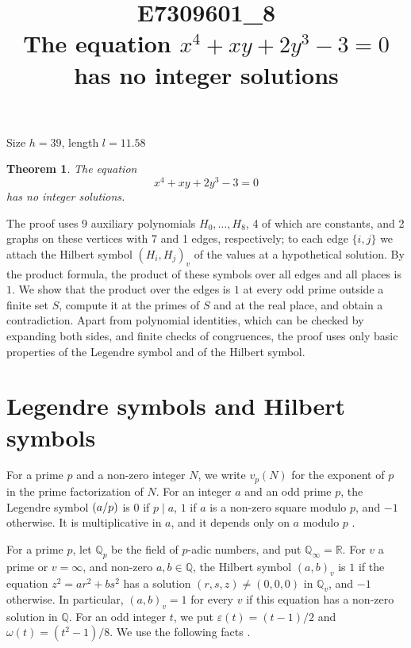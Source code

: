 \documentclass[11pt]{article}
\title{\textbf{E7309601\_8}\\[4pt] {\Large The equation $x^{4}+xy+2y^{3}-3=0$ has no integer solutions}}
\author{}
\date{}
\newtheorem{theorem}{Theorem}
\newcommand{\Q}{\mathbb{Q}}
\newcommand{\leg}[2]{\mathchoice{\biggl(\dfrac{#1}{#2}\biggr)}{(#1/#2)}{(#1/#2)}{(#1/#2)}}
\begin{document}
\maketitle
\vspace{-8ex}
\begin{center}
Size $h=39$, length $l=11.58$
\end{center}

\begin{theorem}\label{thm:main}
The equation
\begin{equation}\label{eq:main}
x^{4}+xy+2y^{3}-3=0
\end{equation}
has no integer solutions.
\end{theorem}

The proof uses 9 auxiliary polynomials $H_0,\dots,H_{8}$, 4 of which are constants, and 2 graphs on these vertices with 7 and 1 edges, respectively; to each edge $\{i,j\}$ we attach the Hilbert symbol $(H_i,H_j)_v$ of the values at a hypothetical solution. By the product formula, the product of these symbols over all edges and all places is $1$. We show that the product over the edges is $1$ at every odd prime outside a finite set $S$, compute it at the primes of $S$ and at the real place, and obtain a contradiction. Apart from polynomial identities, which can be checked by expanding both sides, and finite checks of congruences, the proof uses only basic properties of the Legendre symbol and of the Hilbert symbol.

\section{Legendre symbols and Hilbert symbols}

For a prime $p$ and a non-zero integer $N$, we write $v_p(N)$ for the exponent of $p$ in the prime factorization of $N$. For an integer $a$ and an odd prime $p$, the Legendre symbol $\leg{a}{p}$ is $0$ if $p\mid a$, $1$ if $a$ is a non-zero square modulo $p$, and $-1$ otherwise. It is multiplicative in $a$, and it depends only on $a$ modulo $p$ \cite[Chapter~5]{IR}.

For a prime $p$, let $\Q_p$ be the field of $p$-adic numbers, and put $\Q_\infty=\mathbb R$. For $v$ a prime or $v=\infty$, and non-zero $a,b\in\Q$, the Hilbert symbol $(a,b)_v$ is $1$ if the equation $z^2=ar^2+bs^2$ has a solution $(r,s,z)\neq(0,0,0)$ in $\Q_v$, and $-1$ otherwise. In particular, $(a,b)_v=1$ for every $v$ if this equation has a non-zero solution in $\Q$. For an odd integer $t$, we put $\varepsilon(t)=(t-1)/2$ and $\omega(t)=(t^2-1)/8$. We use the following facts \cite[Chapter~III, Proposition~2 and Theorems~1 and~3]{Se}.
\end{document}
